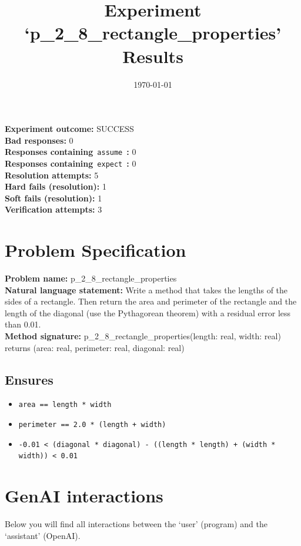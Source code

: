 \documentclass{article}
\begin{document}
\title{Experiment `p\_2\_8\_rectangle\_properties' Results}
\author{\today}
\date{}
\maketitle
\textbf{Experiment outcome: }SUCCESS
\\\textbf{Bad responses: }0
\\\textbf{Responses containing}~\texttt{assume}~\textbf{: }0
\\\textbf{Responses containing}~\texttt{expect}~\textbf{: }0
\\\textbf{Resolution attempts: }5
\\\textbf{Hard fails (resolution): }1
\\\textbf{Soft fails (resolution): }1
\\\textbf{Verification attempts: }3
\section*{Problem Specification}
\textbf{Problem name: }p\_2\_8\_rectangle\_properties
\\\textbf{Natural language statement: }Write a method that takes the lengths of the sides of a rectangle. Then return the area and perimeter of the rectangle and the length of the diagonal (use the Pythagorean theorem) with a residual error less than 0.01.
\\\textbf{Method signature: }p\_2\_8\_rectangle\_properties(length: real, width: real) returns (area: real, perimeter: real, diagonal: real)
\subsection*{Ensures}
\begin{itemize}
\item \texttt{area == length * width}
\item \texttt{perimeter == 2.0 * (length + width)}
\item \texttt{-0.01 < (diagonal * diagonal) - ((length * length) + (width * width)) < 0.01}
\end{itemize}
\clearpage
\section*{GenAI interactions}
Below you will find all interactions between the `user' (program) and the `assistant' (OpenAI).
\end{document}

